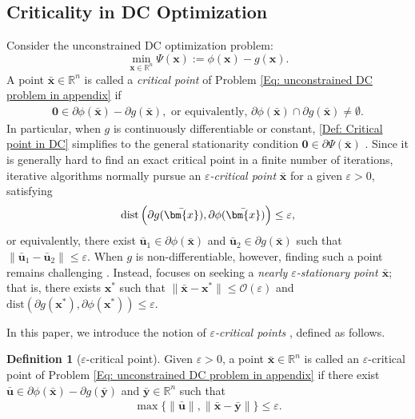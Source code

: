 \documentclass{article}
\theoremstyle{plain}
\theoremstyle{definition}
\newtheorem{definition}{Definition}[section]
\theoremstyle{remark}
\newcommand{\zero}{\bm{0}}
\newcommand{\RR}{\mathbb{R}}
\newcommand{\bx}{\bm{x}}
\newcommand{\bu}{\bm{u}}
\newcommand{\by}{\bm{y}}
\newcommand{\calO}{\mathcal{O}}
\numberwithin{equation}{section}
\begin{document}
\subsection{Criticality in DC Optimization}
\label{app:dc_criticality}
Consider the unconstrained DC optimization problem:
\begin{equation}
    \min_{\bx \in \RR^n} \Psi (\bx) := \phi(\bx) - g(\bx).
    \label{Eq: unconstrained DC problem in appendix}
\end{equation}
A point $\bar{\bx}\in \RR^n$ is called a {\it critical point} \cite{Oliveira2019ProximalBM} of Problem \eqref{Eq: unconstrained DC problem in appendix} if
\begin{align}
    \label{Def: Critical point in DC}
    \zero \in \partial \phi (\bar{\bx}) - \partial g(\bar{\bx}), \text{ or equivalently, }\partial \phi(\bar{\bx}) \cap \partial g(\bar{\bx}) \neq \emptyset.
\end{align}
In particular, when $g$ is continuously differentiable or constant, \eqref{Def: Critical point in DC} simplifies to the general stationarity condition $\zero \in \partial \Psi(\bar{\bx})$ \cite{rockafellar2009variational}. Since it is generally hard to find an exact critical point in a finite number of iterations, iterative algorithms normally pursue an \textit{$\varepsilon$-critical point} $\bar{\bx}$ for a given \(\varepsilon > 0\), satisfying
\begin{align}
    \mathrm{dist}\left(\partial g(\bar{\bx}), \partial \phi (\bar{\bx}) \right) \leq \varepsilon, \notag
\end{align}
or equivalently, there exist $\bar{\bu}_{1} \in \partial \phi (\bar{\bx})$ and $\bar{\bu}_{2} \in \partial g(\bar{\bx})$ such that \(\|\bar{\bu}_{1} - \bar{\bu}_{2}\| \leq \varepsilon\). When $g$ is non-differentiable, however, finding such a point remains challenging \cite{xu2019stochastic}. Instead, \citet{xu2019stochastic} focuses on seeking a \textit{nearly $\varepsilon$-stationary point \( \bar{\bx}\)}; that is, there exists $\bx^*$ such that \( \| \bar{\bx} - \bx^*\| \leq \calO(\varepsilon)\) and \(\mathrm{dist}(\partial g(\bx^*), \partial \phi (\bx^*) ) \leq \varepsilon\).


In this paper, we introduce the notion of \textit{$\varepsilon$-critical points} \cite{moudafi2021complete,sun2023algorithms}, defined as follows.
\begin{definition}[$\varepsilon$-critical point]
    \label{Def: epsilon-critical point in DC} 
    Given $\varepsilon > 0$, a point $\bar{\bx}\in \RR^{n}$ is called an $\varepsilon$-critical point of Problem \eqref{Eq: unconstrained DC problem in appendix} if there exist $\bar{\bu}\in \partial \phi (\bar{\bx}) - \partial g(\bar{\by})$ and \(\bar{\by} \in \RR^n\) such that
    \begin{align}
    \label{Eq: the criticality in def-varepsilon-critical}
        \max \{\|\bar{\bu}\|, \|\bar{\bx}- \bar{\by}\|\} \leq \varepsilon.
    \end{align}
\end{definition}
\end{document}
